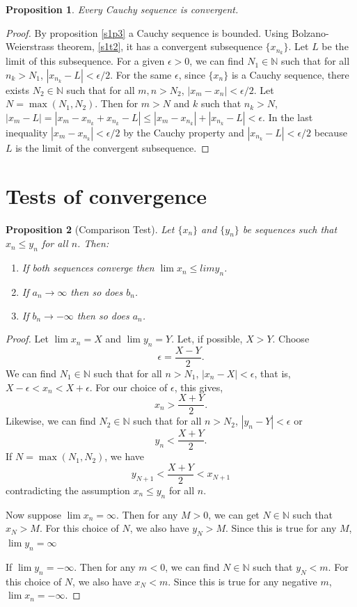 \documentclass{article}
\theoremstyle{plain}
\numberwithin{thm}{section}
\theoremstyle{plain}
\newtheorem{prop}{Proposition}
\numberwithin{prop}{section}
\theoremstyle{definition}
\numberwithin{defn}{section}
\theoremstyle{remark}
\numberwithin{equation}{section}
\begin{document}
\begin{prop}\label{s1p4}
Every Cauchy sequence is convergent.
\end{prop}
\begin{proof}
By proposition \ref{s1p3} a Cauchy sequence is bounded. Using Bolzano-Weierstrass
theorem, \ref{s1t2}, it has a convergent subsequence $\{x_{n_k}\}$. Let $L$ be
the limit of this subsequence. For a given $\epsilon > 0$, we can find $N_1 \in
\mathbb{N}$ such that for all $n_k > N_1$, $|x_{n_k} - L| < \epsilon/2$. For the
same $\epsilon$, since $\{x_n\}$ is a Cauchy sequence, there exists $N_2 \in
\mathbb{N}$ such that for all $m, n > N_2$, $|x_m - x_n| < \epsilon/2$. Let
$N = \max(N_1, N_2)$. Then for $m > N$ and $k$ such that $n_k > N$, $|x_m - L| 
= |x_m - x_{n_k} + x_{n_k} - L| \le |x_m - x_{n_k}| + |x_{n_k} - L| < \epsilon$.
In the last inequality $|x_m - x_{n_k}| < \epsilon/2$ by the Cauchy property
and $|x_{n_k} - L| < \epsilon/2$ because $L$ is the limit of the convergent
subsequence.
\end{proof}

\section{Tests of convergence}\label{s2}
\begin{prop}[Comparison Test]\label{s2p1}
Let $\{x_n\}$ and $\{y_n\}$ be sequences such that $x_n \le y_n$ for all $n$. 
Then:
\begin{enumerate}
\item If both sequences converge then $\lim x_n \le lim y_n$.
\item If $a_n \rightarrow \infty$ then so does $b_n$.
\item If $b_n \rightarrow -\infty$ then so does $a_n$.
\end{enumerate}
\end{prop}
\begin{proof}
Let $\lim x_n = X$ and $\lim y_n = Y$. Let, if possible, $X > Y$. Choose 
\[
\epsilon = \frac{X - Y}{2}.
\]
We can find $N_1 \in \mathbb{N}$ such that for all $n > N_1$, $|x_n - X| <
\epsilon$, that is, $X - \epsilon < x_n < X + \epsilon$. For our choice of 
$\epsilon$, this gives,
\[
x_n > \frac{X + Y}{2}.
\]
Likewise, we can find $N_2 \in \mathbb{N}$ such that for all $n > N_2$, $|y_n -
Y| < \epsilon$ or
\[
y_n < \frac{X + Y}{2}.
\]
If $N = \max(N_1, N_2)$, we have
\[
y_{N+1} < \frac{X + Y}{2} < x_{N+1}
\]
contradicting the assumption $x_n \le y_n$ for all $n$.

Now suppose $\lim x_n = \infty$. Then for any $M > 0$, we can get $N \in 
\mathbb{N}$ such that $x_N > M$. For this choice of $N$, we also have $y_N > M$. 
Since this is true for any $M$, $\lim y_n = \infty$

If $\lim y_n = -\infty$. Then for any $m < 0$, we can find $N \in \mathbb{N}$
such that $y_N < m$. For this choice of $N$, we also have $x_N < m$. Since this
is true for any negative $m$, $\lim x_n = -\infty$.
\end{proof}
\end{document}
